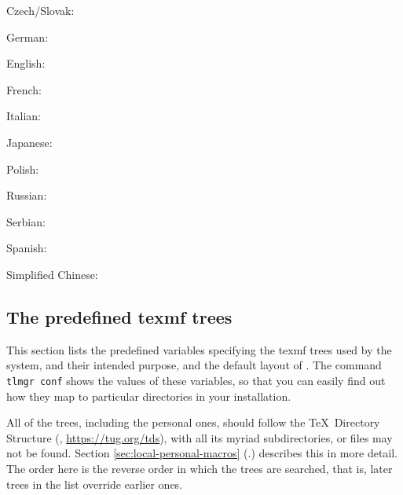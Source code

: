 \documentclass[12pt]{article}
\begin{document}
\begin{itemize*}
\item{Czech/Slovak:} 
\item{German:} 
\item{English:} 
\item{French:} 
\item{Italian:} 
\item{Japanese:} 
\item{Polish:} 
\item{Russian:} 
\item{Serbian:} 
\item{Spanish:} 
\item{Simplified Chinese:} 
\end{itemize*}

\subsection{The predefined texmf trees}
\label{sec:texmftrees}

This section lists the predefined variables specifying the texmf trees
used by the system, and their intended purpose, and the default layout
of \TL{}. The command \texttt{tlmgr~conf} shows the values of these
variables, so that you can easily find out how they map to particular
directories in your installation.

All of the trees, including the personal ones, should follow the \TeX\
Directory Structure (\TDS, \url{https://tug.org/tds}), with all its
myriad subdirectories, or files may not be found.  Section
\ref{sec:local-personal-macros} (\p.\pageref{sec:local-personal-macros})
describes this in more detail.  The order here is the reverse order in
which the trees are searched, that is, later trees in the list override
earlier ones.
\end{document}
